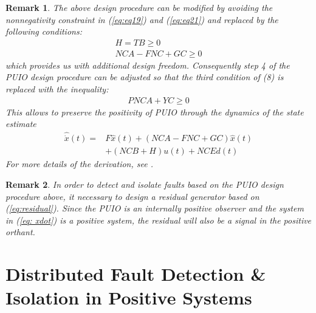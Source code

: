 \documentclass[letterpaper, 10 pt, conference]{ieeeconf}  %
\newtheorem{remark}{Remark}
\begin{document}
\begin{remark} \label{rem:rem4}
The above design procedure can be modified by avoiding the nonnegativity constraint in (\ref{eq:eq19}) and (\ref{eq:eq21}) and replaced by the following conditions:
\begin{align} \label{eq:eq36}
H = TB \geq 0 \\
NCA-FNC+GC \geq 0
\end{align}
which provides us with additional design freedom. Consequently step 4 of the PUIO design procedure can be adjusted so that the third condition of (8) is replaced with the inequality:
\begin{align} \label{eq:eq38}
PNCA+YC \geq 0
\end{align}%
This allows to preserve the positivity of PUIO through the dynamics of the state estimate
\begin{align}
\hat{\dot{x}}(t)=&F\hat{x}(t)+(NCA-FNC+GC)\hat{x}(t) \\ 
&+(NCB+H)u(t) + NCE d(t) \nonumber
\end{align} 
For more details of the derivation, see \cite{oghbaee_complete_2018}.
\end{remark}
\begin{remark} \label{rem:rem5}
In order to detect and isolate faults based on the PUIO design procedure above, it necessary to design a residual generator based on (\ref{eq:residual}). Since the PUIO is an internally positive observer and the system in (\ref{eq: xdot}) is a positive system, the residual will also be a signal in the positive orthant.
\end{remark}

\section{Distributed Fault Detection \& Isolation in Positive Systems} \label{sec:DPUIO}
\end{document}
